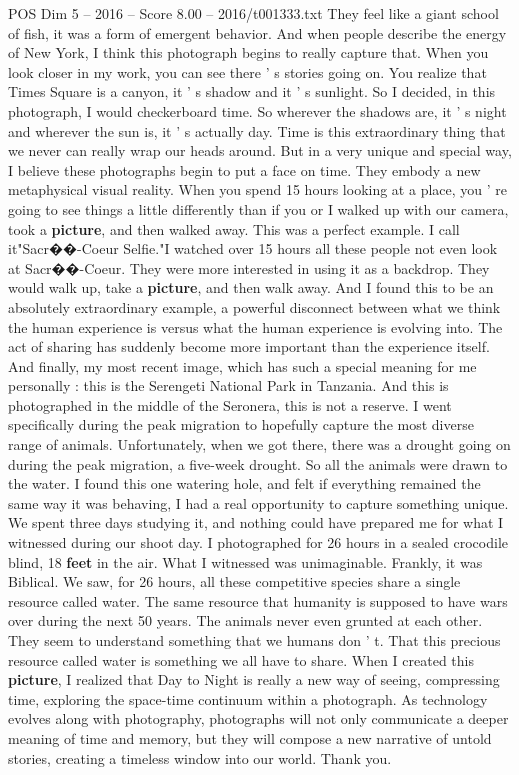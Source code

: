 \begin{textsample}{POS Dim 5 – 2016 – Score 8.00 – 2016/t001333.txt}
They feel like a giant school of fish, it was a form of emergent behavior.
And when people describe the energy of New York, I think this photograph begins to really capture that.
When you look closer in my work, you can see there ' s stories going on.
You realize that Times Square is a canyon, it ' s shadow and it ' s sunlight.
So I decided, in this photograph, I would checkerboard time.
So wherever the shadows are, it ' s night and wherever the sun is, it ' s actually day.
Time is this extraordinary thing that we never can really wrap our heads around.
But in a very unique and special way, I believe these photographs begin to put a face on time.
They embody a new metaphysical visual reality.
When you spend 15 hours looking at a place, you ' re going to see things a little differently than if you or I walked up with our camera, took a \textbf{picture}, and then walked away.
This was a perfect example.
I call it"Sacr{\EmojiFont �}{\EmojiFont �}-Coeur Selfie."I watched over 15 hours all these people not even look at Sacr{\EmojiFont �}{\EmojiFont �}-Coeur.
They were more interested in using it as a backdrop.
They would walk up, take a \textbf{picture}, and then walk away.
And I found this to be an absolutely extraordinary example, a powerful disconnect between what we think the human experience is versus what the human experience is evolving into.
The act of sharing has suddenly become more important than the experience itself.
And finally, my most recent image, which has such a special meaning for me personally : this is the Serengeti National Park in Tanzania.
And this is photographed in the middle of the Seronera, this is not a reserve.
I went specifically during the peak migration to hopefully capture the most diverse range of animals.
Unfortunately, when we got there, there was a drought going on during the peak migration, a five-week drought.
So all the animals were drawn to the water.
I found this one watering hole, and felt if everything remained the same way it was behaving, I had a real opportunity to capture something unique.
We spent three days studying it, and nothing could have prepared me for what I witnessed during our shoot day.
I photographed for 26 hours in a sealed crocodile blind, 18 \textbf{feet} in the air.
What I witnessed was unimaginable.
Frankly, it was Biblical.
We saw, for 26 hours, all these competitive species share a single resource called water.
The same resource that humanity is supposed to have wars over during the next 50 years.
The animals never even grunted at each other.
They seem to understand something that we humans don ' t.
That this precious resource called water is something we all have to share.
When I created this \textbf{picture}, I realized that Day to Night is really a new way of seeing, compressing time, exploring the space-time continuum within a photograph.
As technology evolves along with photography, photographs will not only communicate a deeper meaning of time and memory, but they will compose a new narrative of untold stories, creating a timeless window into our world.
Thank you.

\end{textsample}
